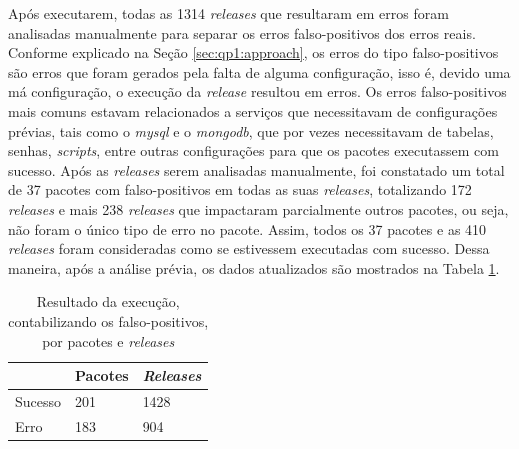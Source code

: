 Após executarem, todas as 1314 \textit{releases} que resultaram em erros foram analisadas manualmente para separar os erros falso-positivos dos erros reais. Conforme explicado na Seção \ref{sec:qp1:approach}, os erros do tipo falso-positivos são erros que foram gerados pela falta de alguma configuração, isso é, devido uma má configuração, o execução da \textit{release} resultou em erros. Os erros falso-positivos mais comuns estavam relacionados a serviços que necessitavam de configurações prévias, tais como o \textit{mysql} e o \textit{mongodb}, que por vezes necessitavam de tabelas, senhas, \textit{scripts}, entre outras configurações para que os pacotes executassem com sucesso. Após as \textit{releases} serem analisadas manualmente, foi constatado um total de 37 pacotes com falso-positivos em todas as suas \textit{releases}, totalizando 172 \textit{releases} e mais 238 \textit{releases} que impactaram parcialmente outros pacotes, ou seja, não foram o único tipo de erro no pacote. Assim, todos os 37 pacotes e as 410 \textit{releases} foram consideradas como se estivessem executadas com sucesso. Dessa maneira, após a análise prévia, os dados atualizados são mostrados na Tabela \ref{tab:res_rq1_2}.

\begin{table}[]
\centering
\begin{tabular}{|l|l|l|}
\hline
                    & Pacotes & \textit{Releases} \\ \hline
    Sucesso         & 201     & 1428     \\
    Erro            & 183     & 904     \\ \hline
\end{tabular}
\caption{Resultado da execução, contabilizando os falso-positivos, por pacotes e \textit{releases}}
\label{tab:res_rq1_2}
\end{table}